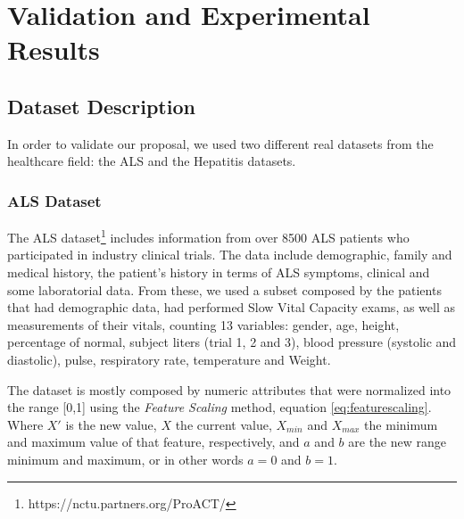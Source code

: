 
\chapter{Validation and Experimental Results}
\label{chapter:results}

\section{Dataset Description}
\label{section:datasets}
In order to validate our proposal, we used two different real datasets from the healthcare field: the ALS and the Hepatitis datasets.

\subsection{ALS Dataset}
\label{subsection:als}

The ALS dataset\footnote{https://nctu.partners.org/ProACT/} includes information from over 8500 ALS patients who participated in industry
 clinical trials. The data include demographic, family and medical history, the patient's history in terms of ALS symptoms,
 clinical and some laboratorial data. From these, we used a subset composed by the patients that had demographic data, had 
 performed Slow Vital Capacity exams, as well as measurements of their vitals, counting 13 variables: gender, age, height, 
 percentage of normal, subject liters (trial 1, 2 and 3), blood pressure (systolic and diastolic), pulse, respiratory rate,
 temperature and Weight. 
 
 The dataset is mostly composed by numeric attributes that were normalized into the range [0,1] using the \emph{Feature Scaling} method, equation \ref{eq:featurescaling}. Where $X'$ is the new value, $X$ the current value, $X_{min}$ and $X_{max}$ the minimum and maximum value of that feature, respectively, and $a$ and $b$ are the new range minimum and maximum, or in other words $a=0$ and $b=1$. 
 
